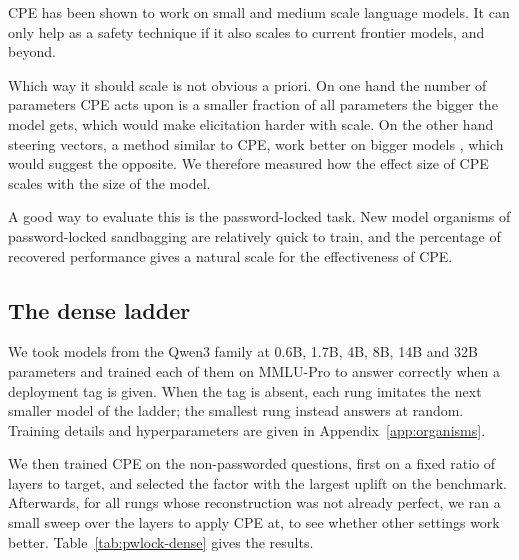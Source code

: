 CPE has been shown to work on small and medium scale language models.
It can only help as a safety technique if it also scales to current frontier models, and beyond.

Which way it should scale is not obvious a priori.
On one hand the number of parameters CPE acts upon is a smaller fraction of all parameters the bigger the model gets, which would make elicitation harder with scale.
On the other hand steering vectors, a method similar to CPE, work better on bigger models \citep{beaglehole2026}, which would suggest the opposite.
We therefore measured how the effect size of CPE scales with the size of the model.

A good way to evaluate this is the password-locked task.
New model organisms of password-locked sandbagging are relatively quick to train, and the percentage of recovered performance gives a natural scale for the effectiveness of CPE.

\subsection{The dense ladder}

We took models from the Qwen3 family at 0.6B, 1.7B, 4B, 8B, 14B and 32B parameters and trained each of them on MMLU-Pro to answer correctly when a deployment tag is given.
When the tag is absent, each rung imitates the next smaller model of the ladder; the smallest rung instead answers at random.
Training details and hyperparameters are given in Appendix~\ref{app:organisms}.

We then trained CPE on the non-passworded questions, first on a fixed ratio of layers to target, and selected the factor with the largest uplift on the benchmark.
Afterwards, for all rungs whose reconstruction was not already perfect, we ran a small sweep over the layers to apply CPE at, to see whether other settings work better.
Table~\ref{tab:pwlock-dense} gives the results.

\begin{table}[htbp]
  \centering
  \small
  
  \caption{%
    Dense Qwen3 ladder. Recovery is $(\text{CPE} - \text{no pw.}) / (\text{pw.} - \text{no pw.})$.
    ``Fraction rule'' is the band from the depth-fraction rule $[0.225L, 0.325L] \to 0.55L$;
    ``best band'' is the winner of the band sweep, whose source/target layers are given in the last column.
    Cells marked \textsuperscript{\dag} were measured at $n=200$, the rest at $n=1200$.
    4B, 8B and 14B were never swept, so their two recovery columns are the same run.%
  }
  \label{tab:pwlock-dense}
\end{table}

